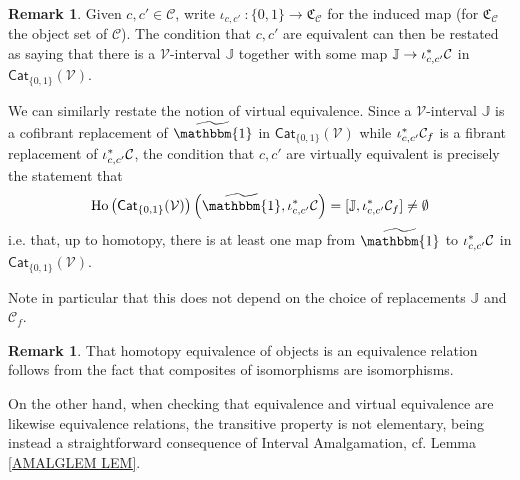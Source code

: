 \documentclass[a4paper,10pt
,draft
]{article}%
\numberwithin{equation}{section}
\numberwithin{figure}{section}
\theoremstyle{definition} %
\newtheorem{remark}[equation]{Remark}%
\DeclareMathOperator{\Ho}{Ho}
\newcommand{\V}{\ensuremath{\mathcal V}}
\newcommand{\1}{\ensuremath{\mathbbm 1}}%
\begin{document}
\begin{remark}\label{VIRTEQRESTA REM}
Given $c,c' \in \mathcal{C}$, write $\iota_{c,c'} \ \colon \{0,1\} \to \mathfrak{C}_{\mathcal{C}}$
for the induced map
(for $\mathfrak{C}_{\mathcal{C}}$ the object set of 
$\mathcal{C}$).
%
The condition that $c,c'$ are equivalent can then be restated as saying that
there is a $\V$-interval $\mathbb{J}$
together with some map $\mathbb{J} \to \iota^{\**}_{c,c'}\mathcal{C}$ in $\mathsf{Cat}_{\{0,1\}}(\V)$. 

We can similarly restate the notion of virtual equivalence.
Since a $\V$-interval $\mathbb{J}$ is a cofibrant replacement of $\widetilde{\mathbbm{1}}$ in $\mathsf{Cat}_{\{0,1\}}(\V)$
while $\iota^{\**}_{c,c'} \mathcal{C}_f$ is a fibrant replacement of $\iota^{\**}_{c,c'} \mathcal{C}$,
the condition that $c,c'$ are virtually equivalent is precisely the statement that
\[
\Ho \left(\mathsf{Cat}_{\{0,1\}}(\V)\right)\left(\widetilde{\mathbbm{1}},\iota^{\**}_{c,c'} \mathcal{C}\right)
=
[\mathbb{J},\iota^{\**}_{c,c'} \mathcal{C}_f] 
\neq
 \emptyset
\]
i.e. that, up to homotopy, there is at least one map from $\widetilde{\mathbbm{1}}$ to $\iota^{\**}_{c,c'} \mathcal{C}$
in $\mathsf{Cat}_{\{0,1\}}(\V)$.

Note in particular that this does not depend on the choice of %
replacements 
$\mathbb{J}$ and $\mathcal{C}_f$.
\end{remark}


\begin{remark}
That homotopy equivalence of objects is an equivalence relation 
follows from the fact that composites of isomorphisms are isomorphisms.

On the other hand, when checking that equivalence and virtual equivalence are likewise equivalence relations,
the transitive property is not elementary, being instead 
a straightforward consequence of Interval Amalgamation, cf. Lemma \ref{AMALGLEM LEM}.
\end{remark}
\end{document}
